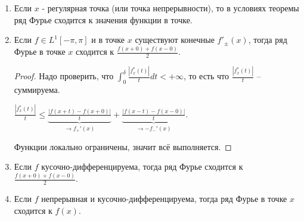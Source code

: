 \begin{consequence}
    \begin{enumerate}
        \item {
            Если $x$ - регулярная точка (или точка непрерывности), то в условиях теоремы ряд Фурье сходится к значения функции в точке.
        }
        \item {

            Если $f \in L^1[-\pi, \pi]$ и в точке $x$ существуют конечные $f'_{\pm} (x)$, тогда ряд Фурье в точке $x$ сходится к $\frac{f(x + 0) + f(x - 0)}{2}$.

            \begin{proof}
                Надо проверить, что $\int_{0}^{\delta} \frac{|f_x^*(t)|}{t} dt < +\infty$, то есть что $\frac{|f_x^*(t)|}{t}$ -- суммируема.

                $\frac{|f_x^* (t)|}{t} \leqslant \underbrace{\frac{|f(x + t) - f(x + 0)|}{t}}_{\rightarrow f_+'(x)} + \underbrace{\frac{|f(x - t) - f(x - 0)|}{t}}_{\rightarrow -f_-' (x)}$.

                Функции локально ограничены, значит всё выполняется.
            \end{proof}
        }
        \item {


            Если $f$ кусочно-дифференцируема, тогда ряд Фурье сходится к $\frac{f(x+0) + f(x-0)}{2}$.
        }
        \item {

            Если $f$ непрерывная и кусочно-дифференцируема, тогда ряд Фурье в точке $x$ сходится к $f(x)$.
        }
    \end{enumerate}
\end{consequence}

